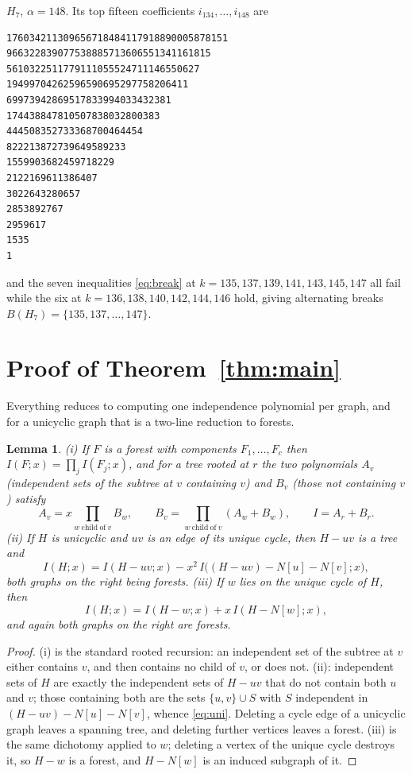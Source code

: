 \documentclass[11pt]{amsart}
\newtheorem{lemma}[theorem]{Lemma}
\theoremstyle{definition}
\theoremstyle{remark}
\newcommand{\Ip}{I}
\newcommand{\albr}{\alpha}
\begin{document}
\medskip
\noindent$H_7$, $\albr=148$. Its top fifteen coefficients $i_{134},\dots,i_{148}$ are
{\footnotesize
\begin{verbatim}
176034211309656718484117918890005878151
966322839077538885713606551341161815
5610322511779111055524711146550627
19499704262596590695297758206411
69973942869517833994033432381
174438847810507838032800383
444508352733368700464454
822213872739649589233
1559903682459718229
2122169611386407
3022643280657
2853892767
2959617
1535
1
\end{verbatim}}
\noindent
and the seven inequalities \eqref{eq:break} at
$k=135,137,139,141,143,145,147$ all fail while the six at
$k=136,138,140,142,144,146$ hold, giving alternating breaks
$B(H_7)=\{135,137,\dots,147\}$.

\section{Proof of Theorem~\ref{thm:main}}

Everything reduces to computing one independence polynomial per graph, and for a
unicyclic graph that is a two-line reduction to forests.

\begin{lemma}\label{lem:rec}
\textup{(i)} If $F$ is a forest with components $F_1,\dots,F_c$ then
$\Ip(F;x)=\prod_j\Ip(F_j;x)$, and for a tree rooted at $r$ the two polynomials
$A_v$ (independent sets of the subtree at $v$ containing $v$) and $B_v$ (those not
containing $v$) satisfy
\[
 A_v=x\prod_{w\ \mathrm{child\ of}\ v}B_w,\qquad
 B_v=\prod_{w\ \mathrm{child\ of}\ v}(A_w+B_w),\qquad
 \Ip=A_r+B_r .
\]
\textup{(ii)} If $H$ is unicyclic and $uv$ is an edge of its unique cycle, then
$H-uv$ is a tree and
\begin{equation}\label{eq:uni}
 \Ip(H;x)=\Ip(H-uv;x)-x^2\,\Ip\bigl((H-uv)-N[u]-N[v];x\bigr),
\end{equation}
both graphs on the right being forests.
\textup{(iii)} If $w$ lies on the unique cycle of $H$, then
\begin{equation}\label{eq:split}
 \Ip(H;x)=\Ip(H-w;x)+x\,\Ip(H-N[w];x),
\end{equation}
and again both graphs on the right are forests.
\end{lemma}

\begin{proof}
(i) is the standard rooted recursion: an independent set of the subtree at $v$ either
contains $v$, and then contains no child of $v$, or does not. (ii): independent sets
of $H$ are exactly the independent sets of $H-uv$ that do not contain both $u$ and
$v$; those containing both are the sets $\{u,v\}\cup S$ with $S$ independent in
$(H-uv)-N[u]-N[v]$, whence \eqref{eq:uni}. Deleting a cycle edge of a unicyclic graph
leaves a spanning tree, and deleting further vertices leaves a forest. (iii) is the
same dichotomy applied to $w$; deleting a vertex of the unique cycle destroys it, so
$H-w$ is a forest, and $H-N[w]$ is an induced subgraph of it.
\end{proof}
\end{document}
